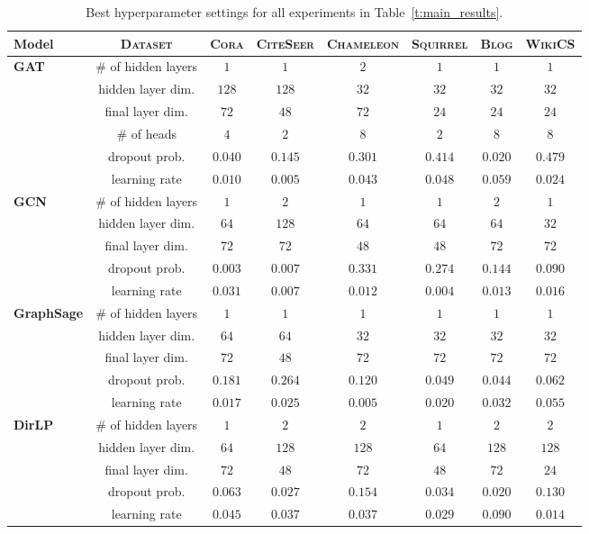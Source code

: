 \documentclass{article}
\begin{document}
\begin{table}[!htp]\label{t:best_settings}
\caption{Best hyperparameter settings for all experiments in Table~\ref{t:main_results}.}
\centering
\begin{tabular}{l c c c c c c c}
\textbf{Model} & \textsc{Dataset} & \textsc{Cora} & \textsc{CiteSeer} & \textsc{Chameleon} & \textsc{Squirrel} & \textsc{Blog} & \textsc{WikiCS} \\
\hline
\multirow{6}{*}{\textbf{GAT}} 
 & \# of hidden layers         & $1$ & $1$ &  $2$ &  $1$ &  $1$ &  $1$ \\
 & hidden layer dim.            & $128$ & $128$ &  $32$ &  $32$ &  $32$ &  $32$ \\
 & final layer dim.          & $72$ & $48$ &  $72$ &  $24$ &  $24$ &  $24$ \\
 & \# of heads                 & $4$ & $2$ &  $8$ &  $2$ &  $8$ &  $8$ \\
 & dropout prob.                    & $0.040$ & $0.145$ &  $0.301$ &  $0.414$ &  $0.020$ &  $0.479$ \\
 & learning rate                   & $0.010$ & $0.005$ &  $0.043$ &  $0.048$ &  $0.059$ &  $0.024$ \\
\hline
\multirow{5}{*}{\textbf{GCN}} 
 & \# of hidden layers         & $1$ & $2$ &  $1$ &  $1$ &  $2$ &  $1$ \\
 & hidden layer dim.            & $64$ & $128$ &  $64$ &  $64$ &  $64$ &  $32$ \\
 & final layer dim.          & $72$ & $72$ &  $48$ &  $48$ &  $72$ &  $72$ \\
 & dropout prob.                    & $0.003$ & $0.007$ &  $0.331$ &  $0.274$ &  $0.144$ &  $0.090$ \\
 & learning rate                   & $0.031$ & $0.007$ &  $0.012$ &  $0.004$ &  $0.013$ &  $0.016$ \\
\hline
\multirow{5}{*}{\textbf{GraphSage}} 
 & \# of hidden layers         & $1$ & $1$ &  $1$ &  $1$ &  $1$ &  $1$ \\
 & hidden layer dim.            & $64$ & $64$ &  $32$ &  $32$ &  $32$ &  $32$ \\
 & final layer dim.          & $72$ & $48$ &  $72$ &  $72$ &  $72$ &  $72$ \\
 & dropout prob.                    & $0.181$ & $0.264$ &  $0.120$ &  $0.049$ &  $0.044$ &  $0.062$ \\
 & learning rate                   & $0.017$ & $0.025$ &  $0.005$ &  $0.020$ &  $0.032$ &  $0.055$ \\
\hline
\multirow{5}{*}{\textbf{DirLP}} 
 & \# of hidden layers & $1$ & $2$ &  $2$ &  $1$ & $2$ &  $2$ \\
 & hidden layer dim. & $64$ & $128$ &  $128$ &  $64$ & $128$ &  $128$ \\
 & final layer dim. & $72$ & $48$ &  $72$ &  $48$ &  $72$ &  $24$ \\
 & dropout prob. & $0.063$ & $0.027$ &  $0.154$ &  $0.034$ &  $0.020$ &  $0.130$ \\
 & learning rate & $0.045$ & $0.037$ &  $0.037$ &  $0.029$ &  $0.090$ &  $0.014$ \\
\end{tabular}
\end{table}
\end{document}
